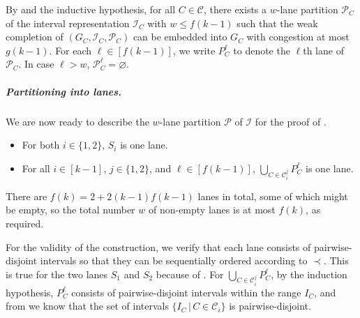 \documentclass[11pt]{article}
\theoremstyle{definition}
\theoremstyle{remark}
\renewcommand{\emptyset}{\varnothing}
\begin{document}
 By  and the inductive hypothesis, for all $C \in \mathcal{C}$, there exists a $w$-lane partition $\mathcal{P}_C$ of the interval representation $\mathcal{I}_C$ with $w \leq f(k-1)$ such that the weak completion of $(G_C,\mathcal{I}_C,\mathcal{P}_C)$ can be embedded into $G_C$ with congestion at most $g(k-1)$. For each $\ell \in [f(k-1)]$, we write ${P}_C^\ell$ to denote the $\ell$th lane of $\mathcal{P}_C$. In case $\ell > w$, $\mathcal{P}_C^\ell = \emptyset$.

 \subparagraph{Partitioning into lanes.} We are now ready to describe the $w$-lane partition $\mathcal{P}$ of $\mathcal{I}$ for the proof of .
 \begin{itemize}
     \item For both $i \in \{1,2\}$, $S_i$ is one lane.
     \item For all $i \in [k-1]$, $j \in \{1,2\}$, and $\ell \in [f(k-1)]$, $\bigcup_{C \in \mathcal{C}_i^j} {P}_C^\ell$ is one lane.
 \end{itemize}
 There are $f(k) = 2 + 2(k-1)f(k-1)$ lanes in total, some of which might be empty, so the total number $w$ of non-empty lanes is at most $f(k)$, as required.

 For the validity of the construction, we verify that each lane consists of pairwise-disjoint intervals so that they can be sequentially ordered according to $\prec$. This is true for the two lanes $S_1$ and $S_2$ because of . For $\bigcup_{C \in \mathcal{C}_i^j} {P}_C^\ell$, by the induction hypothesis, ${P}_C^\ell$ consists of pairwise-disjoint intervals within the range $I_C$, and from  we know that the set of intervals $\{ I_C \, | \,  C \in \mathcal{C}_i \}$ is pairwise-disjoint.
\end{document}

